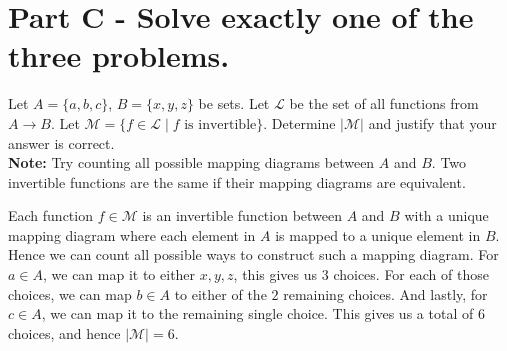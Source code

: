 \documentclass[12pt]{article} %
\begin{document}
\begin{qstn}
\begin{enumerate}[label=(\alph*)]
\begin{center}
    \end{center}
  \end{enumerate}
\end{qstn}

\newpage


\section*{Part C - Solve exactly one of the three problems.} 

\begin{qstn}
  Let $A = \{a,b,c\}$, $B = \{x,y,z\}$ be sets. Let $\mathcal{L}$ be the set of all functions from $A \to B$. Let
  $\mathcal{M} = \{f \in \mathcal{L} \mid f \text{ is invertible}\} $. Determine $\left|\mathcal{M}\right|$ and
  justify that your answer is correct.\\
  \textbf{Note: }Try counting all possible mapping diagrams between $A$ and $B$. Two invertible functions are the same if their mapping diagrams are equivalent.
\end{qstn}
\begin{solution}[\textbf{1}]
  Each function $f \in \mathcal{M}$ is an invertible function between $A$ and $B$ with a unique mapping diagram
  where each element in $A$ is mapped to a unique element in $B$. Hence we can count all possible ways to
  construct such a mapping diagram. For $a \in A$, we can map it to either $x,y,z$, this gives us  $3$ choices.
  For each of those choices, we can map $b \in A$ to either of the $2$ remaining choices. And lastly, for $c \in
  A$, we can map it to the remaining single choice. This gives us a total of $6$ choices, and hence $
  \left|\mathcal{M}\right| = 6$.
\end{solution}
\end{document}
